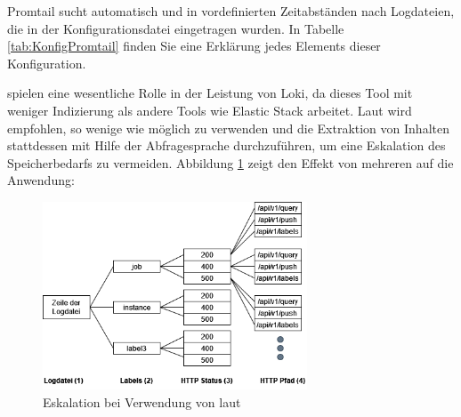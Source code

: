 
Promtail sucht automatisch und in vordefinierten Zeitabständen nach Logdateien, die in der Konfigurationsdatei eingetragen wurden. In Tabelle \ref{tab:KonfigPromtail} finden Sie eine Erklärung jedes Elements dieser Konfiguration.

 spielen eine wesentliche Rolle in der Leistung von Loki, da dieses Tool mit weniger Indizierung als andere Tools wie Elastic Stack arbeitet. Laut \cite{Grafana_labels} wird empfohlen, so wenige  wie möglich zu verwenden und die Extraktion von Inhalten stattdessen mit Hilfe der Abfragesprache durchzuführen, um eine Eskalation des Speicherbedarfs zu vermeiden. Abbildung \ref{fig:Eskalation_Labels} zeigt den Effekt von mehreren  auf die Anwendung:

\begin{figure}[H]
  \centering
  \includegraphics[width=0.7\textwidth]{assets/labelstream.png}
  \caption[Eskalation bei Verwendung von ]
  {Eskalation bei Verwendung von  laut \cite{Grafana_labels}}
  \label{fig:Eskalation_Labels}
  \centering
\end{figure}

